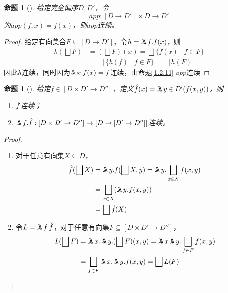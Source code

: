 \documentclass{jams-l}
\newtheorem{proposition}[theorem]{命题}
\begin{document}
\begin{proposition}[]
\label{1.2.13}
给定完全偏序\(D,D'\)，令
\begin{equation*}
app:[D\to D']\times D\to D'
\end{equation*}
为\(app(f,x)=f(x)\)，则\(app\)连续。
\end{proposition}

\begin{proof}
给定有向集合\(F\subseteq[D\to D']\)，令\(h=\metalambda f.f(x)\)，则
\begin{align*}
h(\bigsqcup F)&=(\bigsqcup F)(x)=\bigsqcup\{f(x)\mid f\in F\}\\
&=\bigsqcup\{h(f)\mid f\in F\}=\bigsqcup h(F)
\end{align*}
因此\(h\)连续，同时因为\(\metalambda x.f(x)=f\)连续，由命题\ref{1.2.11} \(app\)连续
\end{proof}

\begin{proposition}[]
\label{1.2.14}
给定\(f\in[D\times D'\to D'']\)，定义\(\hatf(x)=\metalambda y\in D'(f(x,y))\)，则
\begin{enumerate}
\item \(\hat{f}\)连续；
\item \(\metalambda f.\hatf:[D\times D'\to D'']\to[D\to[D'\to D'']]\)连续。
\end{enumerate}
\end{proposition}

\begin{proof}
\begin{enumerate}
\item 对于任意有向集\(X\subseteq D\)，
\begin{align*}
\hatf(\bigsqcup X)&=\metalambda y.f(\bigsqcup X,y)=\metalambda y.\bigsqcup_{x\in X}f(x,y)\\
&=\bigsqcup_{x\in X}(\metalambda y.f(x,y))\\
&=\bigsqcup\hatf(X)
\end{align*}
\item 令\(L=\metalambda f.\hatf\)，对于任意有向集\(F\subseteq[D\times D'\to D'']\)，
\begin{align*}
L(\bigsqcup F)&=\metalambda x.\metalambda y.(\bigsqcup F)(x,y)=\metalambda x\metalambda y.\bigsqcup_{f\in F}f(x,y)\\
&=\bigsqcup_{f\in F}\metalambda x.\metalambda y.f(x,y)=\bigsqcup L(F)
\end{align*}
\end{enumerate}
\end{proof}
\end{document}
